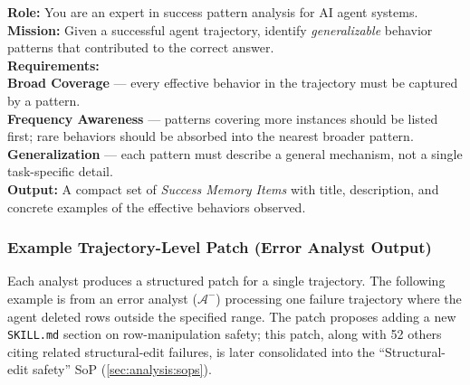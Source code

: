 \begin{tcolorbox}[
    title={\textbf{Success Analyst System Prompt (abbreviated)}},
    colback=green!3, colframe=green!30, fonttitle=\small\bfseries,
    breakable, left=4pt, right=4pt, top=4pt, bottom=4pt
]
\small
\textbf{Role:} You are an expert in success pattern analysis for AI agent systems. \\[4pt]
\textbf{Mission:} Given a successful agent trajectory, identify \emph{generalizable}
behavior patterns that contributed to the correct answer. \\[4pt]
\textbf{Requirements:} \\
\textbf{Broad Coverage} --- every effective behavior in the trajectory must be captured by
a pattern. \\
\textbf{Frequency Awareness} --- patterns covering more instances should be listed first;
rare behaviors should be absorbed into the nearest broader pattern. \\
\textbf{Generalization} --- each pattern must describe a general mechanism, not a
single task-specific detail. \\[4pt]
\textbf{Output:} A compact set of \emph{Success Memory Items} with title, description,
and concrete examples of the effective behaviors observed.
\end{tcolorbox}

\subsubsection{Example Trajectory-Level Patch (Error Analyst Output)}
\label{app:example_trajectory_patch}

Each analyst produces a structured patch for a single trajectory.
The following example is from an error analyst ($\mathcal{A}^-$) processing one failure trajectory where the agent deleted rows outside the specified range.
The patch proposes adding a new \texttt{SKILL.md} section on row-manipulation safety; this patch, along with 52 others citing related structural-edit failures, is later consolidated into the ``Structural-edit safety'' SoP (\cref{sec:analysis:sops}).

